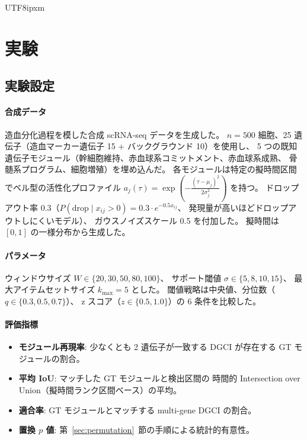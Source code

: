 \documentclass[11pt,a4paper]{article}
\begin{document}
\begin{CJK}{UTF8}{ipxm}
\section{実験}
\label{sec:experiments}

\subsection{実験設定}

\paragraph{合成データ}
造血分化過程を模した合成 scRNA-seq データを生成した。
$n = 500$ 細胞、25 遺伝子（造血マーカー遺伝子 15 + バックグラウンド 10）を使用し、
5 つの既知遺伝子モジュール（幹細胞維持、赤血球系コミットメント、赤血球系成熟、
骨髄系プログラム、細胞増殖）を埋め込んだ。
各モジュールは特定の擬時間区間でベル型の活性化プロファイル
$a_j(\tau) = \exp\!\left(-\frac{(\tau - \mu_j)^2}{2\sigma_j^2}\right)$ を持つ。
ドロップアウト率 0.3（$P(\text{drop} \mid x_{ij} > 0) = 0.3 \cdot e^{-0.5 x_{ij}}$、
発現量が高いほどドロップアウトしにくいモデル）、
ガウスノイズスケール 0.5 を付加した。
擬時間は $[0, 1]$ の一様分布から生成した。

\paragraph{パラメータ}
ウィンドウサイズ $W \in \{20, 30, 50, 80, 100\}$、
サポート閾値 $\sigma \in \{5, 8, 10, 15\}$、
最大アイテムセットサイズ $k_{\max} = 5$ とした。
閾値戦略は中央値、分位数（$q \in \{0.3, 0.5, 0.7\}$）、
z スコア（$z \in \{0.5, 1.0\}$）の 6 条件を比較した。

\paragraph{評価指標}
\begin{itemize}
  \item \textbf{モジュール再現率}: 少なくとも 2 遺伝子が一致する DGCI が存在する
        GT モジュールの割合。
  \item \textbf{平均 IoU}: マッチした GT モジュールと検出区間の
        時間的 Intersection over Union（擬時間ランク区間ベース）の平均。
  \item \textbf{適合率}: GT モジュールとマッチする multi-gene DGCI の割合。
  \item \textbf{置換 $p$ 値}: 第~\ref{sec:permutation}~節の手順による統計的有意性。
\end{itemize}


\end{CJK}
\end{document}
